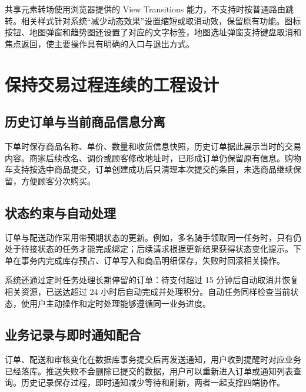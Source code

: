 共享元素转场使用浏览器提供的 View Transitions 能力，不支持时按普通路由跳转。相关样式针对系统“减少动态效果”设置缩短或取消动效，保留原有功能。图标按钮、地图弹窗和趋势图还设置了对应的文字标签，地图选址弹窗支持键盘取消和焦点返回，使主要操作具有明确的入口与退出方式。

\section{保持交易过程连续的工程设计}
\subsection{历史订单与当前商品信息分离}
下单时保存商品名称、单价、数量和收货信息快照，历史订单据此展示当时的交易内容。商家后续改名、调价或顾客修改地址时，已形成订单仍保留原有信息。购物车支持按选中商品提交，订单创建成功后只清理本次提交的条目，未选商品继续保留，方便顾客分次购买。

\subsection{状态约束与自动处理}
订单与配送动作采用带预期状态的更新。例如，多名骑手领取同一任务时，只有仍处于待接状态的任务才能完成绑定；后续请求根据更新结果获得状态变化提示。下单在事务内完成库存预占、订单写入和商品明细保存，失败时回滚相关操作。

系统还通过定时任务处理长期停留的订单：待支付超过 15 分钟后自动取消并恢复相关资源，已送达超过 24 小时后自动完成并处理积分。自动任务同样检查当前状态，使用户主动操作和定时处理能够遵循同一业务进度。

\subsection{业务记录与即时通知配合}
订单、配送和审核变化在数据库事务提交后再发送通知，用户收到提醒时对应业务已经落库。推送失败不会删除已提交的数据，用户可以重新进入订单或通知列表查询。历史记录保存过程，即时通知减少等待和刷新，两者一起支撑四端协作。

